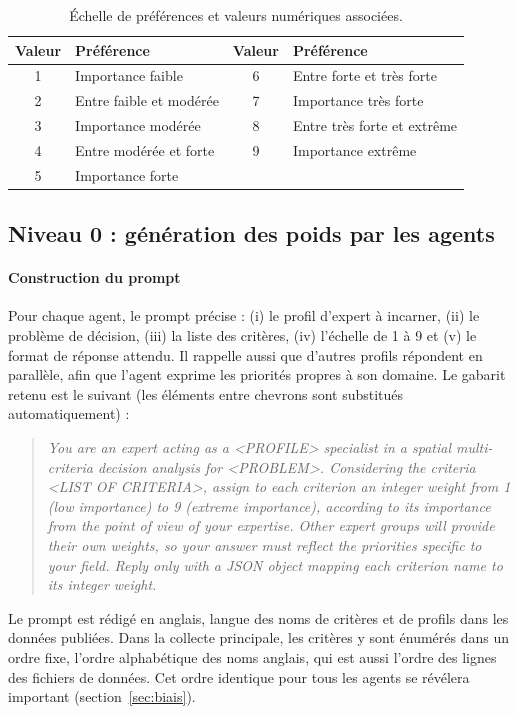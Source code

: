 \documentclass[11pt,a4paper]{article}
\begin{document}
\begin{table}[htbp]
\centering
\caption{Échelle de préférences et valeurs numériques associées.}
\label{tab:echelle}
\begin{tabular}{cl@{\qquad}cl}
\toprule
Valeur & Préférence & Valeur & Préférence \\
\midrule
1 & Importance faible & 6 & Entre forte et très forte \\
2 & Entre faible et modérée & 7 & Importance très forte \\
3 & Importance modérée & 8 & Entre très forte et extrême \\
4 & Entre modérée et forte & 9 & Importance extrême \\
5 & Importance forte & & \\
\bottomrule
\end{tabular}
\end{table}

\subsection{Niveau 0 : génération des poids par les agents}\label{sec:niveau0}

\paragraph{Construction du prompt} Pour chaque agent, le prompt précise : (i) le profil d'expert à incarner, (ii) le problème de décision, (iii) la liste des critères, (iv) l'échelle de 1 à 9 et (v) le format de réponse attendu. Il rappelle aussi que d'autres profils répondent en parallèle, afin que l'agent exprime les priorités propres à son domaine. Le gabarit retenu est le suivant (les éléments entre chevrons sont substitués automatiquement) :
\begin{quote}
\small\itshape
You are an expert acting as a <PROFILE> specialist in a spatial multi-criteria decision analysis for <PROBLEM>. Considering the criteria <LIST OF CRITERIA>, assign to each criterion an integer weight from 1 (low importance) to 9 (extreme importance), according to its importance from the point of view of your expertise. Other expert groups will provide their own weights, so your answer must reflect the priorities specific to your field. Reply only with a JSON object mapping each criterion name to its integer weight.
\end{quote}
Le prompt est rédigé en anglais, langue des noms de critères et de profils dans les données publiées. Dans la collecte principale, les critères y sont énumérés dans un ordre fixe, l'ordre alphabétique des noms anglais, qui est aussi l'ordre des lignes des fichiers de données. Cet ordre identique pour tous les agents se révélera important (section~\ref{sec:biais}).
\end{document}
